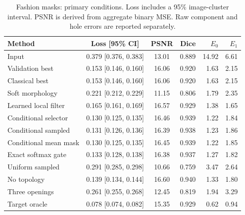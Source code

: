 \begin{table}[htbp]

\centering\small

\caption{Fashion masks: primary conditions. Loss includes a 95\% image-cluster interval. PSNR is derived from aggregate binary MSE. Raw component and hole errors are reported separately.}

\begin{tabular}{lccrrr}

\toprule Method & Loss [95\% CI] & PSNR & Dice & $E_0$ & $E_1$\\\midrule

Input & 0.379 [0.376, 0.383] & 13.01 & 0.889 & 14.92 & 6.61\\

Validation best & 0.153 [0.146, 0.160] & 16.06 & 0.920 & 1.63 & 2.15\\

Classical best & 0.153 [0.146, 0.160] & 16.06 & 0.920 & 1.63 & 2.15\\

Soft morphology & 0.221 [0.212, 0.229] & 11.15 & 0.806 & 1.79 & 2.35\\

Learned local filter & 0.165 [0.161, 0.169] & 16.57 & 0.929 & 1.38 & 1.65\\

Conditional selector & 0.130 [0.125, 0.135] & 16.46 & 0.939 & 1.22 & 1.84\\

Conditional sampled & 0.131 [0.126, 0.136] & 16.39 & 0.938 & 1.23 & 1.86\\

Conditional mean mask & 0.130 [0.125, 0.135] & 16.45 & 0.939 & 1.22 & 1.85\\

Exact softmax gate & 0.133 [0.128, 0.138] & 16.38 & 0.937 & 1.27 & 1.82\\

Uniform sampled & 0.291 [0.285, 0.298] & 10.66 & 0.759 & 3.47 & 2.64\\

No topology & 0.139 [0.134, 0.144] & 16.60 & 0.940 & 1.33 & 1.80\\

Three openings & 0.261 [0.255, 0.268] & 12.45 & 0.819 & 1.94 & 3.29\\

Target oracle & 0.078 [0.074, 0.082] & 15.35 & 0.929 & 0.62 & 0.94\\

\bottomrule\end{tabular}

\end{table}

